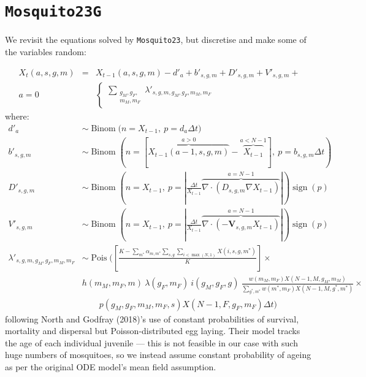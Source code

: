 \documentclass[11pt,a4paper]{article}
\DeclareMathOperator*{\Binom}{\textrm{Binom}}
\DeclareMathOperator*{\Pois}{\textrm{Pois}}
\DeclareMathOperator*{\sign}{\textrm{sign}}
\begin{document}
\section{\tt Mosquito23G}

We revisit the equations solved by {\tt Mosquito23}, but discretise and make some of the variables random:

\begin{eqnarray*}
X_t(a,s,g,m) &=& X_{t-1}(a,s,g,m) -d'_{a} + b'_{s,g,m} + D'_{s,g,m} + V'_{s,g,m}
+ \\
a = 0 & & \begin{cases}
\displaystyle \sum_{\substack{g_M, g_F,\\m_M, m_F}} \lambda'_{s,g,m,g_M,g_F,m_M,m_F}

\end{cases}
\end{eqnarray*}
where:
\begin{align}
d'_a & \sim \Binom \big(n = X_{t-1},\ p = d_a \Delta t\big) \\ 
b'_{s,g,m} & \sim \Binom \left(n = \left[ \overbrace{X_{t-1}(a-1,s,g,m)}^{a>0} - \overbrace{X_{t-1}}^{a<N-1} \right],\ p = b_{s,g,m} \Delta t\right) \\
D'_{s,g,m} & \sim \Binom \left(n = X_{t-1},\ p = \left| \frac{\Delta t}{X_{t-1}} \overbrace{\nabla \cdot (D_{s,g,m} \nabla X_{t-1})}^{a=N-1} \right| \right) \sign(p) \\
V'_{s,g,m} & \sim \Binom \left(n = X_{t-1},\ p = \left| \frac{\Delta t}{X_{t-1}} \overbrace{\nabla \cdot (- \mathbf{V}_{s,g,m} X_{t-1})}^{a=N-1} \right| \right) \sign(p) \\
\lambda'_{s,g,m,g_M,g_F,m_M,m_F} & \sim \Pois \Bigg( \left[ \frac{K - \sum_{m^*} \alpha_{m, m^*} \sum_{s,g} \sum_{i<\max(N,1)} X(i,s,g,m^*)}{K} \right] \times \\
& h(m_M,m_F,m)\ \lambda(g_F, m_F)\ i(g_M, g_F, g)\ \frac{w(m_M, m_F) X(N-1,M,g_M,m_M)}{\sum_{g^*,m^*} w(m^*, m_F) X(N-1,M,g^*,m^*)} \times \\
& \qquad p(g_M, g_F, m_M, m_F, s) X(N-1,F,g_F,m_F) \Delta t \Bigg) 
\end{align}
following North and Godfray (2018)'s use of constant probabilities of survival, mortality and dispersal but Poisson-distributed egg laying. Their model tracks the age of each individual juvenile --- this is not feasible in our case with such huge numbers of mosquitoes, so we instead assume constant probability of ageing as per the original ODE model's mean field assumption.
\end{document}
